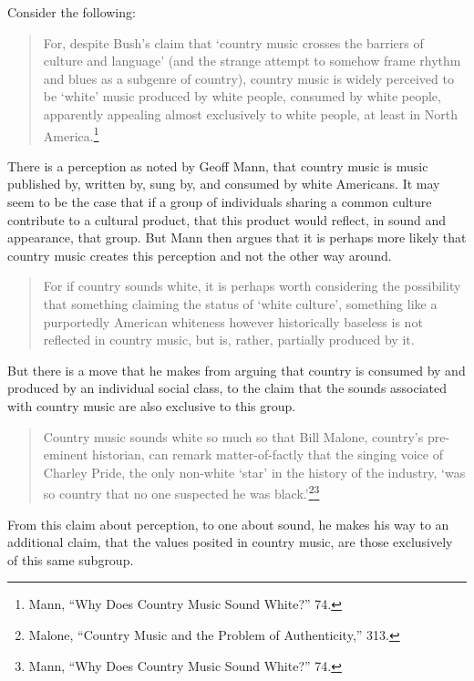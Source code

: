 \documentclass[
  12pt,
]{book}
\theoremstyle{definition}
\theoremstyle{definition}
\theoremstyle{definition}
\theoremstyle{definition}
\theoremstyle{remark}
\begin{document}
Consider the following:

\begin{quote}
For, despite Bush's claim that `country music crosses the barriers of culture and language' (and the strange attempt to somehow frame rhythm and blues as a subgenre of country), country music is widely perceived to be `white' music produced by white people, consumed by white people, apparently appealing almost exclusively to white people, at least in North America.\footnote{Mann, {``Why Does Country Music Sound White?''} 74.}
\end{quote}

There is a perception as noted by Geoff Mann, that country music is music published by, written by, sung by, and consumed by white Americans. It may seem to be the case that if a group of individuals sharing a common culture contribute to a cultural product, that this product would reflect, in sound and appearance, that group. But Mann then argues that it is perhaps more likely that country music creates this perception and not the other way around.

\begin{quote}
For if country sounds white, it is perhaps worth considering the possibility that something claiming the status of `white culture', something like a purportedly American whiteness however historically baseless is not reflected in country music, but is, rather, partially produced by it.
\end{quote}

But there is a move that he makes from arguing that country is consumed by and produced by an individual social class, to the claim that the sounds associated with country music are also exclusive to this group.

\begin{quote}
Country music sounds white so much so that Bill Malone, country's pre-eminent historian, can remark matter-of-factly that the singing voice of Charley Pride, the only non-white `star' in the history of the industry, `was so country that no one suspected he was black.'\footnote{Malone, {``Country {Music} and the {Problem} of {Authenticity},''} 313.}\footnote{Mann, {``Why Does Country Music Sound White?''} 74.}
\end{quote}

From this claim about perception, to one about sound, he makes his way to an additional claim, that the values posited in country music, are those exclusively of this same subgroup.
\end{document}
